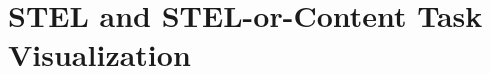 \newpage
\section{STEL and STEL-or-Content Task Visualization}
\label{sec:appendix:stelfig}

\stelfig
